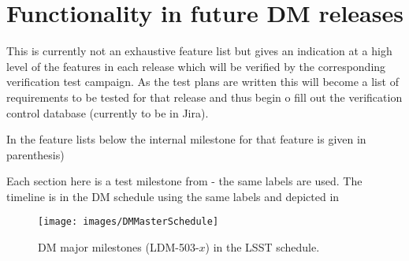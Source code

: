 \section{Functionality in future DM releases}
\label{sect:features}

This is currently not an exhaustive feature list but gives an indication at a high level of the features in each release which will be verified by the corresponding verification test campaign.
As the test plans are written this will become a list of requirements to be tested for that release and thus begin o fill out the verification control database (currently to be in Jira).

In the feature lists below the internal milestone for that feature is given in parenthesis)


Each section here is a test milestone from  - the same labels are used. The timeline is in the DM schedule using the same labels and depicted in 

\begin{figure}[htbp]
        \begin{center}
                 \texttt{[image: images/DMMasterSchedule]}
                 \caption{DM major milestones (LDM-503-$x$) in the LSST schedule. \label{fig:schedule}}
         \end{center}
 \end{figure}
~


